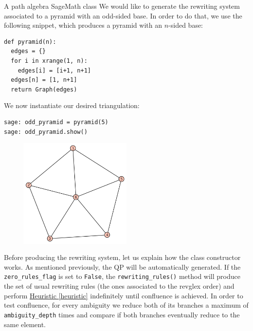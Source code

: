 \begin{chapter}{A path algebra SageMath class}
We would like to generate the rewriting system associated to a pyramid with an odd-sided base. In order to do that, we use the following snippet, which produces a pyramid with an $n$-sided base:
\begin{lstlisting}
def pyramid(n):
  edges = {}
  for i in xrange(1, n):
    edges[i] = [i+1, n+1]
  edges[n] = [1, n+1]
  return Graph(edges)
\end{lstlisting}
We now instantiate our desired triangulation:
\begin{lstlisting}
sage: odd_pyramid = pyramid(5)
sage: odd_pyramid.show()
\end{lstlisting}
\begin{figure}[h]
\centering
\includegraphics[width=0.5\textwidth]{odd_pyramid.png}
\end{figure}
Before producing the rewriting system, let us explain how the class constructor works. As mentioned previously, the QP will be automatically generated. If the \texttt{zero\_rules\_flag} is set to \texttt{False}, the \texttt{rewriting\_rules()} method will produce the set of usual rewriting rules (the ones associated to the revglex order) and perform \hyperref[heuristic]{Heuristic \ref*{heuristic}} indefinitely until confluence is achieved. In order to test confluence, for every ambiguity we reduce both of its branches a maximum of \texttt{ambiguity\_depth} times and compare if both branches eventually reduce to the same element.


\end{chapter}
